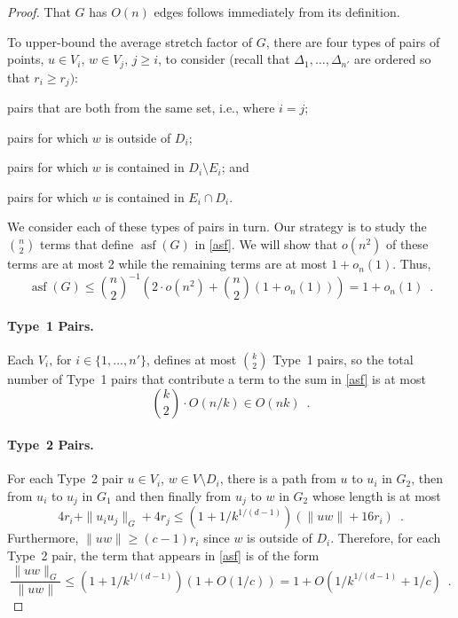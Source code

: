 \documentclass{patmorin}
\DeclareMathOperator{\asf}{asf}
\begin{document}
\begin{proof}
  That $G$ has $O(n)$ edges follows immediately from its definition.

  To upper-bound the average stretch factor of $G$, there are four types
  of pairs of points, $u\in V_i$, $w\in V_j$, $j\ge i$, to consider
  (recall that $\Delta_1,\ldots,\Delta_{n'}$ are ordered so that $r_i \ge r_j)$:
  \begin{compactenum}
    \item pairs that are both from the same set, i.e., where $i=j$;
    \item pairs for which $w$ is outside of $D_i$;
    \item pairs for which $w$ is contained in $D_i\setminus E_i$; and
    \item pairs for which $w$ is contained in $E_i\cap D_i$.
  \end{compactenum}
  We consider each of these types of pairs in turn.  Our strategy is to
  study the $\binom{n}{2}$ terms that define $\asf(G)$ in \eqref{asf}.
  We will show that $o(n^2)$ of these terms are at most 2 while the
  remaining terms are at most $1+o_n(1)$.  Thus,
  \[
     \asf(G)\le \binom{n}{2}^{-1}\left(2\cdot o(n^2)
                                       +\binom{n}{2}(1+o_n(1))\right)
     = 1+o_n(1) \enspace .
  \]

  \paragraph{Type~1 Pairs.}
  Each $V_i$, for $i\in\{1,\ldots,n'\}$, defines at most $\binom{k}{2}$
  Type~1 pairs, so the total number of Type~1 pairs that contribute a
  term to the sum in \eqref{asf} is at most
  \[
    \binom{k}{2}\cdot O(n/k) \in O(nk)
      \enspace .
  \]

  \paragraph{Type~2 Pairs.}
  For each Type~2 pair $u\in V_i$, $w\in V\setminus D_i$, there is a
  path from $u$ to $u_i$ in $G_2$, then from $u_i$ to $u_j$ in $G_1$
  and then finally from $u_j$ to $w$ in $G_2$ whose length is at most
  \[
     4r_i + \|u_iu_j\|_G + 4r_j
      \le (1+1/k^{1/(d-1)})(\|uw\| + 16r_i) \enspace .
  \]
  Furthermore, $\|uw\|\ge (c-1)r_i$ since $w$ is outside of $D_i$.
  Therefore, for each Type~2 pair, the term that appears in \eqref{asf}
  is of the form
  \[
    \frac{\|uw\|_G}{\|uw\|}\le (1+1/k^{1/(d-1)})(1+O(1/c)) 
       = 1+O(1/k^{1/(d-1)}+1/c) \enspace .
  \]


\end{proof}
\end{document}
